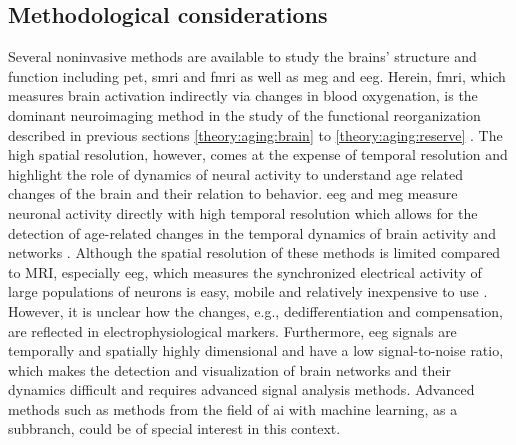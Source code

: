 \subsection{Methodological considerations}
Several noninvasive methods are available to study the brains' structure and function including \gls{pet}, \gls{smri} and \gls{fmri} as well as \gls{meg} and \gls{eeg}. Herein, \Gls{fmri}, which measures brain activation indirectly via changes in blood oxygenation, is the dominant neuroimaging method in the study of the functional reorganization described in previous sections \ref{theory:aging:brain} to \ref{theory:aging:reserve} \cite{Reuter-Lorenz2010}. The high spatial resolution, however, comes at the expense of temporal resolution and \citeauthor{Courtney2021} \cite{Courtney2021} highlight the role of dynamics of neural activity to understand age related changes of the brain and their relation to behavior. \Gls{eeg} and \gls{meg} measure neuronal activity directly with high temporal resolution which allows for the detection of age-related changes in the temporal dynamics of brain activity and networks \cite{Courtney2021}. Although the spatial resolution of these methods is limited compared to MRI, especially \gls{eeg}, which measures the synchronized electrical activity of large populations of neurons is easy, mobile and relatively inexpensive to use \cite{CohenX2017}. However, it is unclear how the changes, e.g., dedifferentiation and compensation, are reflected in electrophysiological markers. Furthermore, \gls{eeg} signals are temporally and spatially highly dimensional and have a low signal-to-noise ratio, which makes the detection and visualization of brain networks and their dynamics difficult and requires advanced signal analysis methods. Advanced methods such as methods from the field of \gls{ai} with machine learning, as a subbranch, could be of special interest in this context.